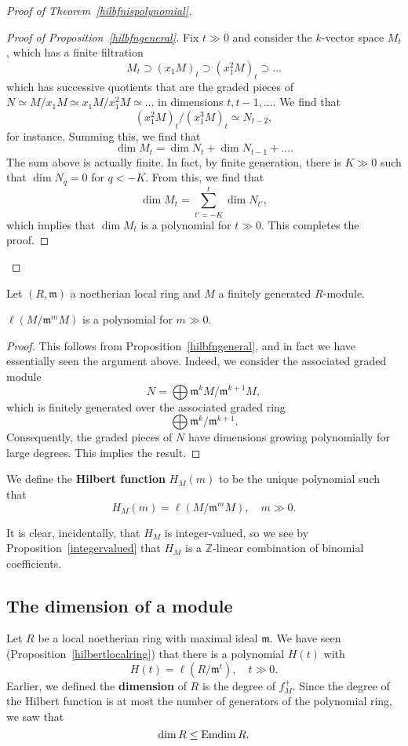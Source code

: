 \begin{proof}[Proof of  Theorem~\ref{hilbfnispolynomial}]
\begin{proof}[Proof of Proposition~\ref{hilbfngeneral}]
Fix $t \gg 0$ and consider the $k$-vector space $M_t$, which has a finite filtration 
\[ M_t \supset (x_1 M)_t \supset (x_1^2 M)_t \supset \dots  \]
which has successive quotients that are the  graded pieces of $N \simeq
M/x_1 M \simeq x_1 M/x_1^2 M \simeq \dots$ in dimensions $t, t-1, \dots$. We
find that
\[ (x_1^2 M)_t/(x_1^3 M)_t \simeq N_{t-2},  \]
for instance. Summing this, we find that
\[ \dim M_t = \dim N_t + \dim N_{t-1} + \dots . \]
The sum above is actually finite. In fact, by finite generation, there is $K
\gg 0 $ such that $\dim N_q  = 0$ for $q< -K$. From this, we find that 
\[ \dim M_t = \sum_{t' = -K}^{t} \dim N_{t'},  \]
which implies that $\dim M_t$ is a polynomial for $t \gg 0$. This completes
the proof.
\end{proof} 
\end{proof}


Let $(R, \mathfrak{m})$ a noetherian local ring and $M$ a finitely generated
$R$-module. 
\begin{proposition} \label{hilbertlocalring} 
$\ell(M/\mathfrak{m}^m M)$ is a polynomial for $m \gg 0$. 
\end{proposition} 
\begin{proof} 
This follows from Proposition~\ref{hilbfngeneral}, and in fact we have
essentially seen the argument above. Indeed, we consider the
associated graded module
\[ N = \bigoplus \mathfrak{m}^k M/\mathfrak{m}^{k+1}M , \]
which is finitely generated over the associated graded ring
\[ \bigoplus \mathfrak{m}^k/\mathfrak{m}^{k+1}.  \]
Consequently, the graded pieces of $N$ have dimensions growing polynomially
for large degrees. This implies the result. 

\end{proof} 
\begin{definition} 
We define the \textbf{Hilbert function} $H_M(m)$  to be the unique polynomial
such that 
\[ H_M(m) = \ell(M/ \mathfrak{m}^m M), \quad m \gg 0.  \]
\end{definition} 

It is clear, incidentally, that $H_M$ is integer-valued, so we see by
Proposition~\ref{integervalued} that $H_M$ is a $\mathbb{Z}$-linear
combination of binomial coefficients.

\subsection{The dimension of a module}
Let $R $ be a local noetherian ring with maximal ideal $\mathfrak{m}$. We
have seen (Proposition~\ref{hilbertlocalring}) that  there is a polynomial $H(t)$ with
\[ H(t) = \ell(R/\mathfrak{m}^t), \quad t \gg 0.  \]
Earlier, we defined the \textbf{dimension} of $R$ is the degree of $f_M^+$. 
Since the degree of the Hilbert function is at most the number of generators
of the polynomial ring, we saw that 
\[ \dim R \leq \operatorname{Emdim} R.  \]

